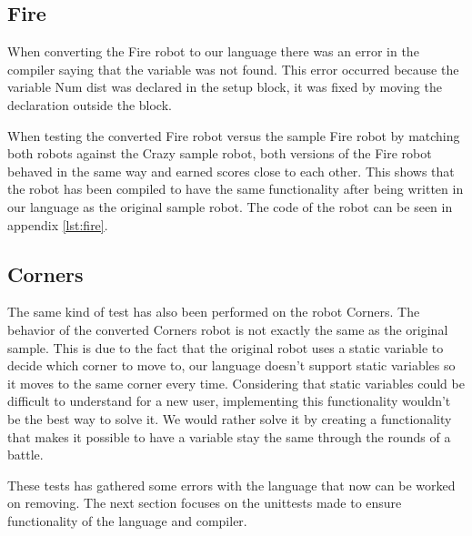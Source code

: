 \subsection{Fire}
When converting the Fire robot to our language there was an error in the compiler saying that the variable was not found. This error occurred because the variable Num dist was declared in the setup block, it was fixed by moving the declaration outside the block.

When testing the converted Fire robot versus the sample Fire robot by matching both robots against the Crazy sample robot, both versions of the Fire robot behaved in the same way and earned scores close to each other.
This shows that the robot has been compiled to have the same functionality after being written in our language as the original sample robot.
The code of the robot can be seen in appendix \ref{lst:fire}.

\subsection{Corners}
The same kind of test has also been performed on the robot Corners. The behavior of the converted Corners robot is not exactly the same as the original sample. This is due to the fact that the original robot uses a static variable to decide which corner to move to, our language doesn't support static variables so it moves to the same corner every time. 
Considering that static variables could be difficult to understand for a new user, implementing this functionality wouldn't be the best way to solve it. We would rather solve it by creating a functionality that makes it possible to have a variable stay the same through the rounds of a battle. 

These tests has gathered some errors with the language that now can be worked on removing. The next section focuses on the unittests made to ensure functionality of the language and compiler.